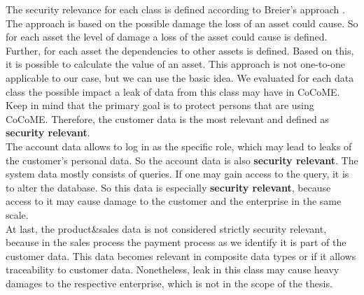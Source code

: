 The security relevance for each class is defined according to Breier's approach \cite{assetValue}. The approach is based on the possible damage the loss of an asset could cause. So for each asset the level of damage a loss of the asset could cause is defined. Further, for each asset the dependencies to other assets is defined. Based on this, it is possible to calculate the value of an asset. This approach is not one-to-one applicable to our case, but we can use the basic idea. We evaluated for each data class the possible impact a leak of data from this class may have in CoCoME. Keep in mind that the primary goal is to protect persons that are using CoCoME. Therefore, the customer data is the most relevant and defined as \textbf{security relevant}.\\ The account data allows to log in as the specific role, which may lead to leaks of the customer's personal data. So the account data is also \textbf{security relevant}. The system data mostly consists of queries. If one may gain access to the query, it is to alter the database. So this data is especially \textbf{security relevant}, because access to it may cause damage to the customer and the enterprise in the same scale.\\ At last, the product\&sales data is not considered strictly security relevant, because in the sales process the payment process as we identify it is part of the customer data. This data becomes relevant in composite data types or if it allows traceability to customer data. Nonetheless, leak in this class may cause heavy damages to the respective enterprise, which is not in the scope of the thesis.
